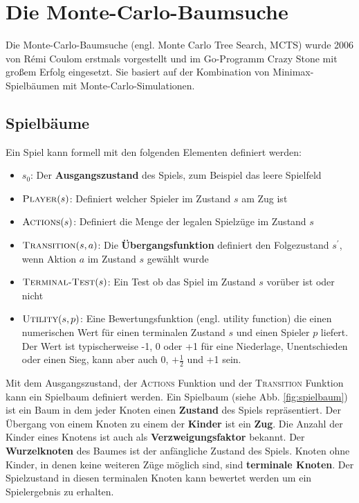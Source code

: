 \section{Die Monte-Carlo-Baumsuche}
\label{chap:mcts-intro}

Die Monte-Carlo-Baumsuche (engl. Monte Carlo Tree Search, MCTS) wurde 2006 von R\'{e}mi Coulom erstmals vorgestellt und im Go-Programm Crazy Stone mit großem Erfolg eingesetzt\autocite{coulomEfficientSelectivityBackup2007}. Sie basiert auf der Kombination von Minimax-Spielbäumen mit Monte-Carlo-Simulationen.


\subsection{Spielbäume}
Ein Spiel kann formell mit den folgenden Elementen definiert werden\autocite[\ppno~162]{russellArtificialIntelligenceModern2009}:
\begin{itemize}
	\item $s_0$: Der \textbf{Ausgangszustand} des Spiels, zum Beispiel das leere Spielfeld
	\item $\textsc{Player}(s)$: Definiert welcher Spieler im Zustand $s$ am Zug ist
	\item $\textsc{Actions}(s)$: Definiert die Menge der legalen Spielzüge im Zustand $s$
	\item $\textsc{Transition}(s,a)$: Die \textbf{Übergangsfunktion} definiert den Folgezustand $s^\prime$, wenn Aktion $a$ im Zustand $s$ gewählt wurde
	\item $\textsc{Terminal-Test}(s)$: Ein Test ob das Spiel im Zustand $s$ vorüber ist oder nicht
	\item $\textsc{Utility}(s,p)$: Eine Bewertungsfunktion (engl. utility function) die einen numerischen Wert für einen terminalen Zustand $s$ und einen Spieler $p$ liefert. Der Wert ist typischerweise -1, 0 oder +1 für eine Niederlage, Unentschieden oder einen Sieg, kann aber auch 0, $+\frac{1}{2}$ und +1 sein.
\end{itemize}

Mit dem Ausgangszustand, der \textsc{Actions} Funktion und der \textsc{Transition} Funktion kann ein Spielbaum definiert werden. Ein Spielbaum (siehe Abb. \ref{fig:spielbaum}) ist ein Baum in dem jeder Knoten einen \textbf{Zustand} des Spiels repräsentiert. Der Übergang von einem Knoten zu einem der \textbf{Kinder} ist ein \textbf{Zug}. Die Anzahl der Kinder eines Knotens ist auch als \textbf{Verzweigungsfaktor} bekannt. Der \textbf{Wurzelknoten} des Baumes ist der anfängliche Zustand des Spiels. Knoten ohne Kinder, in denen keine weiteren Züge möglich sind, sind \textbf{terminale Knoten}. Der Spielzustand in diesen terminalen Knoten kann bewertet werden um ein Spielergebnis zu erhalten.

